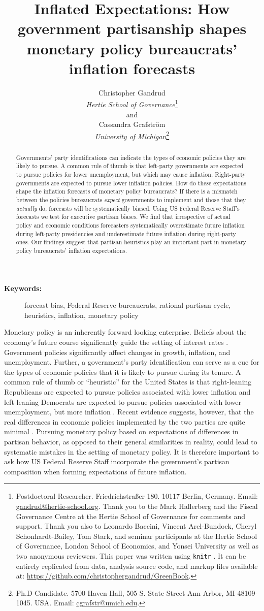 \documentclass[a4paper]{article}
\title{Inflated Expectations: How government partisanship shapes monetary policy bureaucrats' inflation forecasts}
\author{Christopher Gandrud \\
                {\emph{Hertie School of Governance}}\footnote{Postdoctoral Researcher. Friedrichstra{\ss}er 180. 10117 Berlin, Germany. Email: \href{mailto:christopher.gandrud@gmail.com}{gandrud@hertie-school.org}. Thank you to the Mark Hallerberg and the Fiscal Governance Centre at the Hertie School of Governance for comments and support. Thank you also to Leonardo Baccini, Vincent Arel-Bundock, Cheryl Schonhardt-Bailey, Tom Stark, and seminar participants at the Hertie School of Governance, London School of Economics, and Yonsei University as well as two anonymous reviewers. This paper was written using {\tt{knitr}} \citep{knitr2013}. It can be entirely replicated from data, analysis source code, and markup files available at: {\url{https://github.com/christophergandrud/GreenBook}}.} \\
                and \\
            Cassandra Grafstr\"{o}m \\
                {\emph{University of Michigan}}\footnote{Ph.D Candidate. 5700 Haven Hall, 505 S. State Street
                Ann Arbor, MI 48109-1045. USA. Email: \href{mailto:cgrafstr@umich.edu}{cgrafstr@umich.edu}.}}
\begin{document}
\maketitle

\begin{abstract}

Governments' party identifications can indicate the types of economic policies they are likely to pursue. A common rule of thumb is that left-party governments are expected to pursue policies for lower unemployment, but which may cause inflation. Right-party governments are expected to pursue lower inflation policies. How do these expectations shape the inflation forecasts of monetary policy bureaucrats? If there is a mismatch between the policies bureaucrats \emph{expect} governments to implement and those that they \emph{actually} do, forecasts will be systematically biased. Using US Federal Reserve Staff’s forecasts we test for executive partisan biases. We find that irrespective of actual policy and economic conditions forecasters systematically overestimate future inflation during left-party presidencies and underestimate future inflation during right-party ones. Our findings suggest that partisan heuristics play an important part in monetary policy bureaucrats' inflation expectations.

\end{abstract}

\begin{description}
  \item [{\textbf{Keywords:}}] forecast bias, Federal Reserve bureaucrats, rational partisan cycle, heuristics, inflation, monetary policy
\end{description}

\vspace{0.3cm}


Monetary policy is an inherently forward looking enterprise. Beliefs about the economy's future course significantly guide the setting of interest rates \citep[59]{Goodhart2001}. Government policies significantly affect changes in growth, inflation, and unemployment. Further, a government's party identification can serve as a cue for the types of economic policies that it is likely to pursue during its tenure. A common rule of thumb or ``heuristic'' for the United States is that right-leaning Republicans are expected to pursue policies associated with lower inflation and left-leaning Democrats are expected to pursue policies associated with lower unemployment, but more inflation \cite[see][]{Samuelson1977,HibbsJr1977}. Recent evidence suggests, however, that the real differences in economic policies implemented by the two parties are quite minimal \citep{Bartels2008}. Pursuing monetary policy based on expectations of differences in partisan behavior, as opposed to their general similarities in reality, could lead to systematic mistakes in the setting of monetary policy. It is therefore important to ask how US Federal Reserve Staff incorporate the government's partisan composition when forming expectations of future inflation.
\end{document}
